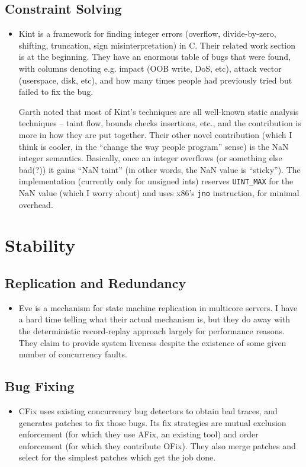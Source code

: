 \documentclass{article}
\begin{document}
\subsection{Constraint Solving}
\begin{itemize}
	\item {\sc Kint} \cite{kint} is a framework for finding integer errors (overflow, divide-by-zero, shifting, truncation, sign misinterpretation) in C. Their related work section is at the beginning. They have an enormous table of bugs that were found, with columns denoting e.g. impact (OOB write, DoS, etc), attack vector (userspace, disk, etc), and how many times people had previously tried but failed to fix the bug.

		Garth noted that most of {\sc Kint}'s techniques are all well-known static analysis techniques -- taint flow, bounds checks insertions, etc., and the contribution is more in how they are put together.
		Their other novel contribution (which I think is cooler, in the ``change the way people program'' sense) is the NaN integer semantics.
		Basically, once an integer overflows (or something else bad(?)) it gains ``NaN taint'' (in other words, the NaN value is ``sticky'').
		The implementation (currently only for unsigned ints) reserves {\tt UINT\_MAX} for the NaN value (which I worry about) and uses x86's {\tt jno} instruction, for minimal overhead.
\end{itemize}


\section{Stability}
\subsection{Replication and Redundancy}
\begin{itemize}
	\item Eve \cite{eve} is a mechanism for state machine replication in multicore servers. I have a hard time telling what their actual mechanism is, but they do away with the deterministic record-replay approach largely for performance reasons. They claim to provide system liveness despite the existence of some given number of concurrency faults.
\end{itemize}

\subsection{Bug Fixing}
\begin{itemize}
	\item CFix \cite{cfix} uses existing concurrency bug detectors to obtain bad traces, and generates patches to fix those bugs. Its fix strategies are mutual exclusion enforcement (for which they use AFix, an existing tool) and order enforcement (for which they contribute OFix). They also merge patches and select for the simplest patches which get the job done.
\end{itemize}
\end{document}
